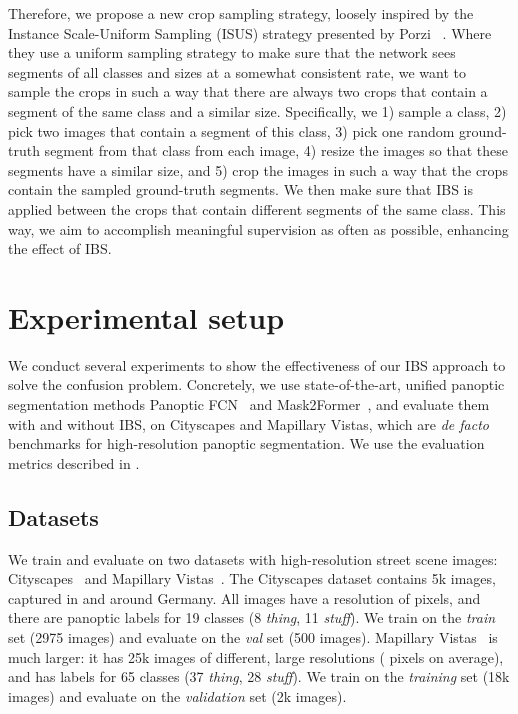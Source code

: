 \documentclass[10pt,twocolumn,letterpaper]{article}
\begin{document}
Therefore, we propose a new crop sampling strategy, loosely inspired by the Instance Scale-Uniform Sampling (ISUS) strategy presented by Porzi \etal~\cite{porzi2021allscales}. Where they use a uniform sampling strategy to make sure that the network sees segments of all classes and sizes at a somewhat consistent rate, we want to sample the crops in such a way that there are always two crops that contain a segment of the same class and a similar size. Specifically, we 1) sample a class, 2) pick two images that contain a segment of this class, 3) pick one random ground-truth segment from that class from each image, 4) resize the images so that these segments have a similar size, and 5) crop the images in such a way that the crops contain the sampled ground-truth segments. We then make sure that IBS is applied between the crops that contain different segments of the same class. This way, we aim to accomplish meaningful supervision as often as possible, enhancing the effect of IBS.
 \section{Experimental setup}
\label{sec:experiments}
We conduct several experiments to show the effectiveness of our IBS approach to solve the confusion problem. Concretely, we use state-of-the-art, unified panoptic segmentation methods Panoptic FCN~\cite{li2021panopticfcn} and Mask2Former~\cite{cheng2021mask2former}, and evaluate them with and without IBS, on Cityscapes and Mapillary Vistas, which are \textit{de facto} benchmarks for high-resolution panoptic segmentation. We use the evaluation metrics described in .


\subsection{Datasets}
\label{sec:experiments:datasets}
We train and evaluate on two datasets with high-resolution street scene images: Cityscapes~\cite{cordts2016cityscapes} and Mapillary Vistas~\cite{neuhold2017mapillary}. The Cityscapes dataset contains 5k images, captured in and around Germany. All images have a resolution of  pixels, and there are panoptic labels for 19 classes (8 \textit{thing}, 11 \textit{stuff}). We train on the \textit{train} set (2975 images) and evaluate on the \textit{val} set (500 images). Mapillary Vistas~\cite{neuhold2017mapillary} is much larger: it has 25k images of different, large resolutions ( pixels on average), and has labels for 65 classes (37 \textit{thing}, 28 \textit{stuff}). We train on the \textit{training} set (18k images) and evaluate on the \textit{validation} set (2k images).
\end{document}
